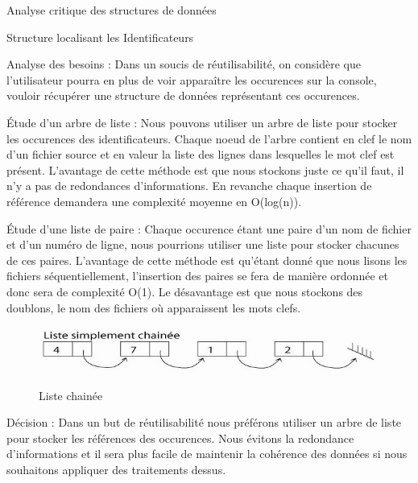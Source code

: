 \documentclass{article}
\begin{document}
\begin{section}{Analyse critique des structures de données}
\begin{subsection}{Structure localisant les Identificateurs}
\begin{paragraph}{Analyse des besoins :}
    Dans un soucis de réutilisabilité, on considère que l'utilisateur pourra en plus de voir apparaître les occurences
    sur la console, vouloir récupérer une structure de données représentant ces occurences.
    \end{paragraph}

    \begin{paragraph}{Étude d'un arbre de liste :}
    Nous pouvons utiliser un arbre de liste pour stocker les occurences des identificateurs. Chaque noeud de l'arbre contient en clef le nom d'un fichier source
    et en valeur la liste des lignes dans lesquelles le mot clef est présent. L'avantage de cette méthode est que nous stockons juste ce qu'il faut, il n'y a pas de redondances
    d'informations. En revanche chaque insertion de référence demandera une complexité moyenne en O(log(n)).
  
    \end{paragraph}
    
    \begin{paragraph}{Étude d'une liste de paire :}
      Chaque occurence étant une paire d'un nom de fichier et d'un numéro de ligne, nous pourrions utiliser une liste pour stocker chacunes de ces paires.
      L'avantage de cette méthode est qu'étant donné que nous lisons les fichiers séquentiellement, l'insertion des paires se fera de manière ordonnée et donc sera de complexité O(1).
      Le désavantage est que nous stockons des doublons, le nom des fichiers où apparaissent les mots clefs.
  
        \begin{figure}[htp]
    \centering
    \includegraphics[scale=0.5]{images/liste.jpg}
    \caption{Liste chainée}
    \end{figure}
    \end{paragraph}
      \FloatBarrier

    \begin{paragraph}{Décision :}
      Dans un but de réutilisabilité nous préférons utiliser un arbre de liste pour stocker les références des occurences. Nous évitons la redondance d'informations
      et il sera plus facile de maintenir la cohérence des données si nous souhaitons appliquer des traitements dessus.
    \end{paragraph}
    
  \end{subsection}

\end{section}
\end{document}
